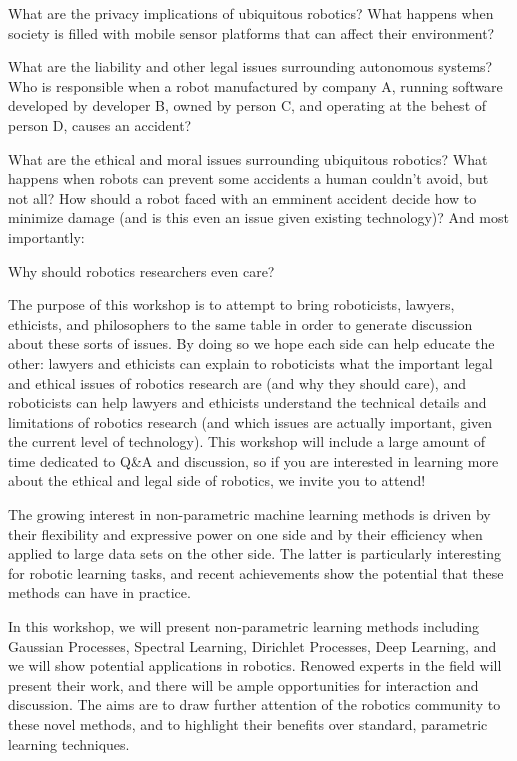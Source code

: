 \begin{spacing}{1.0}
{What are the privacy implications of ubiquitous robotics? What happens when society is filled with mobile sensor platforms that can affect their environment?

What are the liability and other legal issues surrounding autonomous systems? Who is responsible when a robot manufactured by company A, running software developed by developer B, owned by person C, and operating at the behest of person D, causes an accident?

What are the ethical and moral issues surrounding ubiquitous robotics? What happens when robots can prevent some accidents a human couldn't avoid, but not all? How should a robot faced with an emminent accident decide how to minimize damage (and is this even an issue given existing technology)? And most importantly:

Why should robotics researchers even care?

The purpose of this workshop is to attempt to bring roboticists, lawyers, ethicists, and philosophers to the same table in order to generate discussion about these sorts of issues. By doing so we hope each side can help educate the other: lawyers and ethicists can explain to roboticists what the important legal and ethical issues of robotics research are (and why they should care), and roboticists can help lawyers and ethicists understand the technical details and limitations of robotics research (and which issues are actually important, given the current level of technology). This workshop will include a large amount of time dedicated to Q\&A and discussion, so if you are interested in learning more about the ethical and legal side of robotics, we invite you to attend!
}


{
The growing interest in non-parametric machine learning methods is driven by their flexibility and expressive power on one side and by their efficiency when applied to large data sets on the other side. The latter is particularly interesting for robotic learning tasks, and recent achievements show the potential that these methods can have in practice. 

In this workshop, we will present non-parametric learning methods including Gaussian Processes, Spectral Learning, Dirichlet Processes, Deep Learning, and we will show potential applications in robotics. 
Renowed experts in the field will present their work, and there will be ample opportunities for interaction and discussion. The aims are to draw further attention of the robotics community to these novel methods, and to highlight their benefits over standard, parametric learning techniques.
}



\end{spacing}
